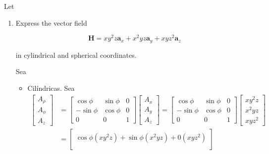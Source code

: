 \begin{problema}
    Let 
    \begin{enumerate}
        \item Express the vector field 

        $$
        \mathbf{H}=x y^{2} z \mathbf{a}_{x}+x^{2} y z \mathbf{a}_{y}+x y z^{2} \mathbf{a}_{z}
        $$
        
        in cylindrical and spherical coordinates.

        \begin{sol}
            Sea 
            \begin{itemize}
                \item Cilíndricas. 
                Sea 
                \begin{align*}
                    \begin{bmatrix}
                        A_\rho\\
                        A_\phi\\
                        A_z
                    \end{bmatrix} &= \begin{bmatrix}
                        \cos\phi & \sin \phi & 0\\
                        -\sin \phi & \cos\phi & 0\\
                        0& 0&1 
                    \end{bmatrix}\begin{bmatrix}
                        A_x\\
                        A_y\\
                        A_z
                    \end{bmatrix}= \begin{bmatrix}
                        \cos\phi & \sin \phi & 0\\
                        -\sin \phi & \cos\phi & 0\\
                        0& 0&1 
                    \end{bmatrix}\begin{bmatrix}
                        xy^2z\\
                        x^2yz\\
                        xyz^2
                    \end{bmatrix}\\
                    &= \begin{bmatrix}
                        \cos\phi(xy^2z)+ \sin \phi(x^2yz) + 0(xyz^2)\\

\end{bmatrix}
\end{align*}
\end{itemize}
\end{sol}
\end{enumerate}
\end{problema}
